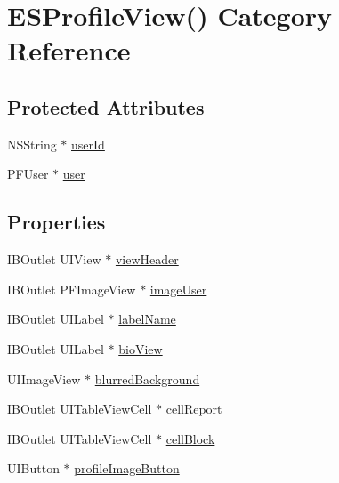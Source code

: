 \hypertarget{category_e_s_profile_view_07_08}{}\section{E\+S\+Profile\+View() Category Reference}
\label{category_e_s_profile_view_07_08}
\subsection*{Protected Attributes}
\begin{DoxyCompactItemize}
\item 
N\+S\+String $\ast$ \hyperlink{category_e_s_profile_view_07_08_a2761cfdb3641da321f8bbdba1dbf562f}{user\+Id}
\item 
P\+F\+User $\ast$ \hyperlink{category_e_s_profile_view_07_08_a132b6835d20fdea7784075334099adc9}{user}
\end{DoxyCompactItemize}
\subsection*{Properties}
\begin{DoxyCompactItemize}
\item 
I\+B\+Outlet U\+I\+View $\ast$ \hyperlink{category_e_s_profile_view_07_08_a7f9431f802b522499bab2a8b4b90f298}{view\+Header}
\item 
I\+B\+Outlet P\+F\+Image\+View $\ast$ \hyperlink{category_e_s_profile_view_07_08_a3e56c07c9aeccde5e488e1df7fcfe5ab}{image\+User}
\item 
I\+B\+Outlet U\+I\+Label $\ast$ \hyperlink{category_e_s_profile_view_07_08_a16688abf50759074dad3e4cff22a3bea}{label\+Name}
\item 
I\+B\+Outlet U\+I\+Label $\ast$ \hyperlink{category_e_s_profile_view_07_08_a39b043600458d3e9171a01232646e4b1}{bio\+View}
\item 
U\+I\+Image\+View $\ast$ \hyperlink{category_e_s_profile_view_07_08_ac1c297b924aa4ac3c198eced3b75208b}{blurred\+Background}
\item 
I\+B\+Outlet U\+I\+Table\+View\+Cell $\ast$ \hyperlink{category_e_s_profile_view_07_08_ae274c8f73382e3ff229eda693a2963d6}{cell\+Report}
\item 
I\+B\+Outlet U\+I\+Table\+View\+Cell $\ast$ \hyperlink{category_e_s_profile_view_07_08_ace2fc34e56d6c51e12cc1b6307bb24da}{cell\+Block}
\item 
U\+I\+Button $\ast$ \hyperlink{category_e_s_profile_view_07_08_a84e00981667dd253f902ca17d76443db}{profile\+Image\+Button}
\end{DoxyCompactItemize}


